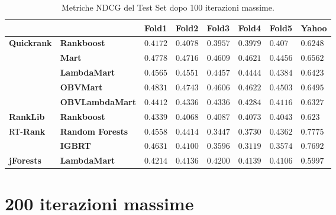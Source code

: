 		\begin{table}[!h]
			\centering
			\begin{tabular}{ll|l|l|l|l|l|l|}
				&& \textbf{Fold1} & \textbf{Fold2} & \textbf{Fold3} & \textbf{Fold4} & \textbf{Fold5} & \textbf{Yahoo}\\
				\hline
				\multirow{5}{*}{\textbf{Quickrank}} & \textbf{Rankboost} & $0.4172$ & $0.4078$ & $0.3957$ & $0.3979$ & $0.407$ & $0.6248$\\
				\cline{2-8}
				& \textbf{Mart} & $0.4778$ & $0.4716$ & $0.4609$ & $0.4621$ & $0.4456$ & $0.6562$\\
				\cline{2-8}
				& \textbf{LambdaMart} & $0.4565$ & $0.4551$ & $0.4457$ & $0.4444$ & $0.4384$ & $0.6423$\\
				\cline{2-8}
				& \textbf{OBVMart} & $0.4831$ & $0.4743$ & $0.4606$ & $0.4622$ & $0.4503$ & $0.6495$\\
				\cline{2-8}
				& \textbf{OBVLambdaMart} & $0.4412$ & $0.4336$ & $0.4336$ & $0.4284$ & $0.4116$ & $0.6327$\\
				\hline
				\textbf{RankLib} & \textbf{Rankboost} & $0.4339$ & $0.4068$ & $0.4087$ & $0.4073$ & $0.4043$ & $0.623$\\
				\hline
				\multirow{2}{*}{RT-\textbf{Rank}} & \textbf{Random Forests} & $0.4558$ & $0.4414$ & $0.3447$ & $0.3730$ & $0.4362$ & $0.7775$\\
				\cline{2-8}
				& \textbf{IGBRT} & $0.4631$ & $0.4100$ & $0.3596$ & $0.3119$ & $0.3574$ & $0.7692$\\
				\hline
				\textbf{jForests} & \textbf{LambdaMart} & $0.4214$ & $0.4136$ & $0.4200$ & $0.4139$ & $0.4106$ & $0.5997$\\
				\hline
			\end{tabular}
			\caption{Metriche NDCG del Test Set dopo 100 iterazioni massime.}
			\label{fig:test_100}
		\end{table}
	
	\section*{200 iterazioni massime}
	
